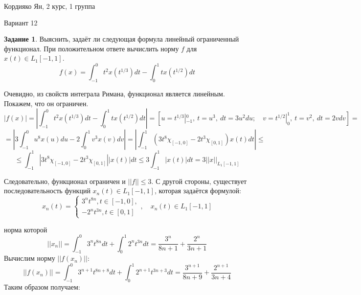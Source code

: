 \documentclass[fleqn]{article}
\begin{document}
Кордияко Ян, 2 курс, 1 группа

Вариант 12

\textbf {Задание 1}. Выяснить, задаёт ли следующая формула линейный ограниченный
функционал. При положительном ответе вычислить норму $f$ для $x(t) \in L_1[-1, 1]$.
\begin{equation*} 
	f(x) = \int_{-1}^0 t^2 x(t^{1/3})dt - \int_0^1 t x(t^{1/2})dt
\end{equation*}

Очевидно, из свойств интеграла Римана, функционал является линейным. Покажем, что он ограничен.
\begin{equation*} 
	|f(x)| = \left|\int_{-1}^0 t^2 x(t^{1/3})dt - \int_0^1 t x(t^{1/2})dt\right| =
	[ u = t^{1/3}|_{-1}^0, \  t = u^3,\  dt = 3u^2du;\quad  v = t^{1/2}|_0^1, \  t = v^2,\  
	dt = 2vdv] = 
\end{equation*}
\begin{equation*} 
	 = \left|3\int_{-1}^0 u^8 x(u)du - 2\int_0^1 v^3 x(v)dv\right| =
	\left|\int_{-1}^1 (3t^8\chi_{[-1, 0]} - 2t^3\chi_{[0, 1]}) x(t)dt\right| \leq
\end{equation*}
\begin{equation*} 
	 \leq \int_{-1}^1 \left|3t^8\chi_{[-1, 0]}-  2t^3\chi_{[0, 1]}\right|  \left|x(t)\right|dt \leq
	 3  \int_{-1}^1 |x(t)|dt = 3||x||_{ L_1[-1, 1]}
\end{equation*}

Следовательно, функционал ограничен и $||f|| \leq 3$. С другой стороны, существует
последовательность функций
$x_n(t) \in L_1[-1, 1]$, которая задаётся формулой:
\begin{equation*} 
	 x_n(t) = \begin{cases} 
				3^nt^{8n}, t \in [-1, 0], \\
				-2^nt^{3n}, t \in [0, 1]
			\end{cases},\quad x_n(t) \in L_1[-1, 1]
\end{equation*}

норма которой
\begin{equation*} 
	||x_n|| = \int_{-1}^0 3^n t^{8n} dt + \int_0^1 2^n t^{3n} dt = \frac{3^n}{8n + 1} + \frac{2^n}{3n + 1}
\end{equation*}
Вычислим норму $||f(x_n)||$:
\begin{equation*} 
	||f(x_n)|| = \int_{-1}^0 3^{n+1} t^{8n + 8} dt + \int_0^1 2^{n+1} t^{3n + 3} dt = \frac{3^{n+1}}{8n + 9} + \frac{2^{n+1}}{3n + 4}
\end{equation*}
Таким образом получаем:
\end{document}
